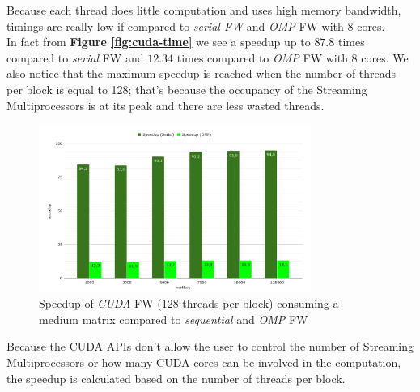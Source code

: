 Because each thread does little computation and uses high memory bandwidth, timings are really low if compared
to \emph{serial-FW} and \emph{OMP} FW with 8 cores. \\
In fact from \textbf{Figure \ref*{fig:cuda-time}} we see a speedup up to $87.8$ times compared to \emph{serial} FW
and $12.34$ times compared to \emph{OMP} FW with 8 cores. We also notice that the maximum speedup is reached when the number of threads per block is equal to 128;
that's because the occupancy of the Streaming Multiprocessors is at its peak and there are less wasted threads.
\begin{figure}[h!]
\centering                                                                        
\includegraphics[width=3.5in]{diagrams/cuda-speedup}
\captionsetup{justification=centering}                                                                                                                                   
\caption{Speedup of \emph{CUDA} FW (128 threads per block) consuming a medium matrix compared to \emph{sequential} and \emph{OMP} FW}                                                                                                                                            
\label{fig:cuda-speedup}                                                                                                                                                           
\end{figure}

Because the CUDA APIs don't allow the user to control the number of Streaming Multiprocessors or how many CUDA cores
can be involved in the computation, the speedup is calculated based on the number of threads per block.


